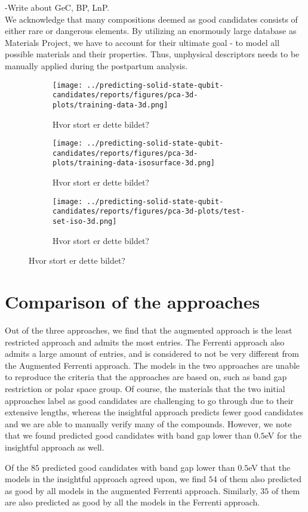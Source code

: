 -Write about GeC, BP, LnP.
\\

We acknowledge that many compositions deemed as good candidates consists of either rare or dangerous elements. By utilizing an enormously large database as Materials Project, we have to account for their ultimate goal - to model all possible materials and their properties. Thus, unphysical descriptors needs to be manually applied during the postpartum analysis.

\begin{figure}[ht!]
  \begin{subfigure}{0.5\textwidth}
    \centering
    \texttt{[image: ../predicting-solid-state-qubit-candidates/reports/figures/pca-3d-plots/training-data-3d.png]}
    \caption{Hvor stort er dette bildet?}
    \label{}
  \end{subfigure}
  \begin{subfigure}{0.5\textwidth}
    \centering
    \texttt{[image: ../predicting-solid-state-qubit-candidates/reports/figures/pca-3d-plots/training-data-isosurface-3d.png]}
    \caption{Hvor stort er dette bildet?}
    \label{}
  \end{subfigure}
  \begin{subfigure}{0.5\textwidth}
    \centering
    \texttt{[image: ../predicting-solid-state-qubit-candidates/reports/figures/pca-3d-plots/test-set-iso-3d.png]}
    \caption{Hvor stort er dette bildet?}
    \label{}
  \end{subfigure}
\end{figure}


\section{Comparison of the approaches}

Out of the three approaches, we find that the augmented approach is the least restricted approach and admits the most entries. The Ferrenti approach also admits a large amount of entries, and is considered to not be very different from the Augmented Ferrenti approach. The models in the two approaches are unable to reproduce the criteria that the approaches are based on, such as band gap restriction or polar space group. Of course, the materials that the two initial approaches label as good candidates are challenging to go through due to their extensive lengths, whereas the insightful approach predicts fewer good candidates and we are able to manually verify many of the compounds. However, we note that we found predicted good candidates with band gap lower than $0.5$eV for the insightful approach as well.

Of the $85$ predicted good candidates with band gap lower than $0.5$eV that the models in the insightful approach agreed upon, we find $54$ of them also predicted as good by all models in the augmented Ferrenti approach. Similarly, $35$ of them are also predicted as good by all the models in the Ferrenti approach.
